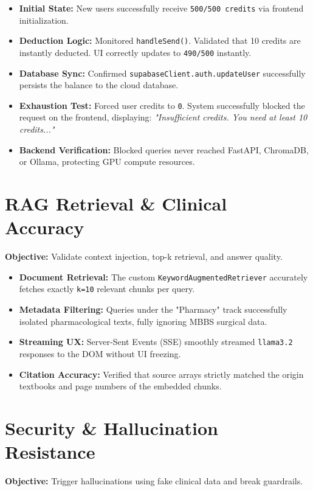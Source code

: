 \documentclass[12pt,a4paper]{article}
\begin{document}
\begin{itemize}[label=\textbullet]
    \item \textbf{Initial State:} New users successfully receive \texttt{500/500 credits} via frontend initialization.
    \item \textbf{Deduction Logic:} Monitored \texttt{handleSend()}. Validated that 10 credits are instantly deducted. UI correctly updates to \texttt{490/500} instantly.
    \item \textbf{Database Sync:} Confirmed \texttt{supabaseClient.auth.updateUser} successfully persists the balance to the cloud database.
    \item \textbf{Exhaustion Test:} Forced user credits to \texttt{0}. System successfully blocked the request on the frontend, displaying: \textit{"Insufficient credits. You need at least 10 credits..."}
    \item \textbf{Backend Verification:} Blocked queries never reached FastAPI, ChromaDB, or Ollama, protecting GPU compute resources.
\end{itemize}

\section{RAG Retrieval \& Clinical Accuracy}
\textbf{Objective:} Validate context injection, top-k retrieval, and answer quality.

\begin{itemize}[label=\textbullet]
    \item \textbf{Document Retrieval:} The custom \texttt{KeywordAugmentedRetriever} accurately fetches exactly \texttt{k=10} relevant chunks per query.
    \item \textbf{Metadata Filtering:} Queries under the "Pharmacy" track successfully isolated pharmacological texts, fully ignoring MBBS surgical data.
    \item \textbf{Streaming UX:} Server-Sent Events (SSE) smoothly streamed \texttt{llama3.2} responses to the DOM without UI freezing.
    \item \textbf{Citation Accuracy:} Verified that source arrays strictly matched the origin textbooks and page numbers of the embedded chunks.
\end{itemize}

\section{Security \& Hallucination Resistance}
\textbf{Objective:} Trigger hallucinations using fake clinical data and break guardrails.
\end{document}
